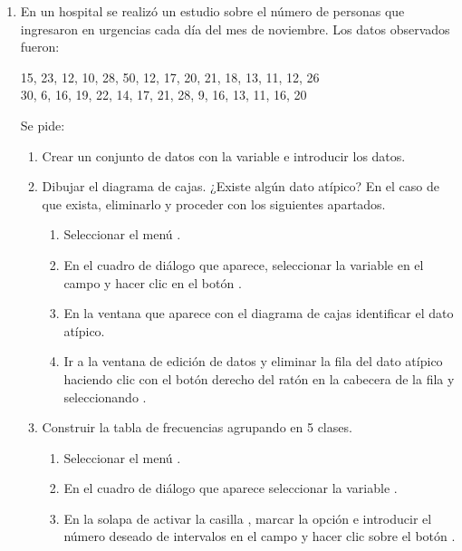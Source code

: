 \begin{enumerate}[leftmargin=*]
\item En un hospital se realizó un estudio sobre el número de personas que ingresaron en urgencias cada día del mes de
noviembre. Los datos observados fueron:
\begin{center}
15, 23, 12, 10, 28, 50, 12, 17, 20, 21, 18, 13, 11, 12, 26 \\
30, 6, 16, 19, 22, 14, 17, 21, 28, 9, 16, 13, 11, 16, 20
\end{center}
Se pide:

\begin{enumerate}
\item  Crear un conjunto de datos con la variable  e introducir los datos.

\item  Dibujar el diagrama de cajas. ¿Existe algún dato atípico? En el caso de que exista, eliminarlo y proceder con los
siguientes apartados.
\begin{indicacion}{
\begin{enumerate}
\item Seleccionar el menú .
\item En el cuadro de diálogo que aparece, seleccionar la variable  en el campo  y
hacer clic en el botón .
\item En la ventana que aparece con el diagrama de cajas identificar el dato atípico.
\item Ir a la ventana de edición de datos y eliminar la fila del dato atípico haciendo clic con el botón derecho del
ratón en la cabecera de la fila y seleccionando . 
\end{enumerate}}
\end{indicacion}

\item Construir la tabla de frecuencias agrupando en 5 clases.
\begin{indicacion}{
\begin{enumerate}
\item Seleccionar el menú .
\item En el cuadro de diálogo que aparece seleccionar la variable .
\item En la solapa de  activar la casilla , marcar la opción  e introducir el número deseado de intervalos en el campo  y hacer clic sobre el botón
.
\end{enumerate}}
\end{indicacion}


\end{enumerate}
\end{enumerate}

